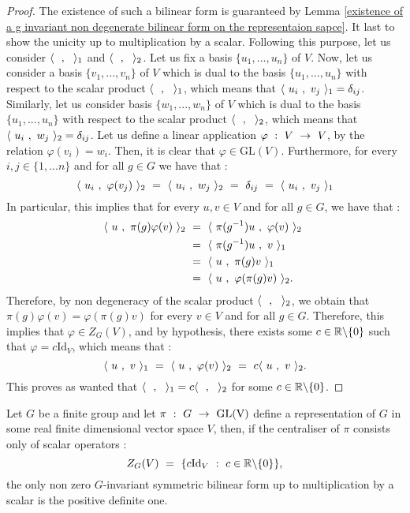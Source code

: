 \begin{proof}
	The existence of such a bilinear form is guaranteed by Lemma \ref{existence of a g invariant non degenerate bilinear form on the representaion sapce}. It last to show the unicity up to multiplication by a scalar. Following this purpose, let us consider $\langle\text{ } \text{ },\text{ }\text{ }\rangle_1$ and $\langle\text{ } \text{ },\text{ }\text{ }\rangle_2$. Let us fix a basis $\{u_1,...,u_n\}$ of $V$. Now, let us consider a basis $\{v_1,...,v_n\}$ of $V$ which is dual to the basis $\{u_1,...,u_n\}$ with respect to the scalar product $\langle\text{ } \text{ },\text{ }\text{ }\rangle_1$, which means that $\langle\text{ } u_i\text{ },\text{ } v_j\text{ }\rangle_1=\delta_{ij}$. Similarly, let us consider basis $\{w_1,...,w_n\}$ of $V$ which is dual to the basis $\{u_1,...,u_n\}$ with respect to the scalar product $\langle\text{ } \text{ },\text{ }\text{ }\rangle_2$, which means that $\langle\text{ } u_i\text{ },\text{ } w_j\text{ }\rangle_2=\delta_{ij}$. Let us define a linear application $\varphi\text{ }:\text{ } V\text{ }\rightarrow\text{ } V$, by the relation $\varphi(v_i)=w_i$. Then, it is clear that $\varphi\in \mbox{GL}(V)$. Furthermore, for every $i,j\in \{1,...n\}$ and for all $g\in G$ we have that :
	\begin{equation}
	\langle\text{ } u_i\text{ },\text{ }\varphi(v_j)\text{ }\rangle_2\text{ }=\text{ } \langle\text{ } u_i\text{ },\text{ } w_j\text{ }\rangle_2\text{ }=\text{ } \delta_{ij}\text{ }=\text{ }\langle\text{ } u_i\text{ },\text{ } v_j\text{ }\rangle_1
	\end{equation}
	In particular, this implies that for every $u,v\in V$ and for all $g\in G$, we have that :
	\begin{equation}
	\begin{split}
	\langle\text{ } u\text{ },\text{ }\pi(g)\varphi(v)\text{ }\rangle_2\text{ }&=\text{ } \langle\text{ } \pi(g^{-1})u\text{ },\text{ }\varphi(v)\text{ }\rangle_2\text{ }\\
	&= \text{ } \langle\text{ } \pi(g^{-1})u\text{ },\text{ } v\text{ }\rangle_1\\
	&=\text{ }  \langle\text{ } u\text{ },\text{ }\pi(g)v\text{ }\rangle_1\\
	&=\text{ }  \langle\text{ } u\text{ },\text{ }\varphi(\pi(g)v)\text{ }\rangle_2.
	\end{split}
	\end{equation}
	Therefore, by non degeneracy of the scalar product $\langle\text{ } \text{ },\text{ }\text{ }\rangle_2$, we obtain that $\pi(g)\varphi(v)=\varphi(\pi(g)v)$ for every $v\in V$ and for all $g\in G$. Therefore, this implies that $\varphi\in Z_G(V)$, and by hypothesis, there exists some $c\in \mathbb R\backslash\{0\}$ such that $\varphi=c\mbox{Id}_V$, which means that :
	\begin{equation}
	\langle\text{ } u\text{ },\text{ } v\text{ }\rangle_1\text{ }=\text{ }\langle\text{ } u\text{ },\text{ }\varphi(v)\text{ }\rangle_2\text{ }=\text{ } c\langle\text{ } u\text{ },\text{ } v\text{ }\rangle_2.
	\end{equation}
	This proves as wanted that $\langle\text{ } \text{ },\text{ }\text{ }\rangle_1=c\langle\text{ } \text{ },\text{ }\text{ }\rangle_2$ for some $c\in \mathbb R\backslash\{0\}$.
\end{proof}
\begin{proposition}\label{la seule form G invariante non nul est positve si jamais on a un centralizer scalaire}
	Let $G$ be a finite group and let $\pi \text{ }:\text{ } G\text{ }\rightarrow\text{ }\mbox{GL(V)}$ define a representation of $G$ in some real finite dimensional vector space $V$, then, if the centraliser of $\pi$ consists only of scalar operators :
	\begin{equation}
	Z_G(V)\text{ }=\text{ } \{c\mbox{Id}_V\text{ } :\text{ } c\in \mathbb R\backslash\{0\}\},
	\end{equation}
	the only non zero $G$-invariant symmetric bilinear form up to multiplication by a scalar is the positive definite one.
\end{proposition}
